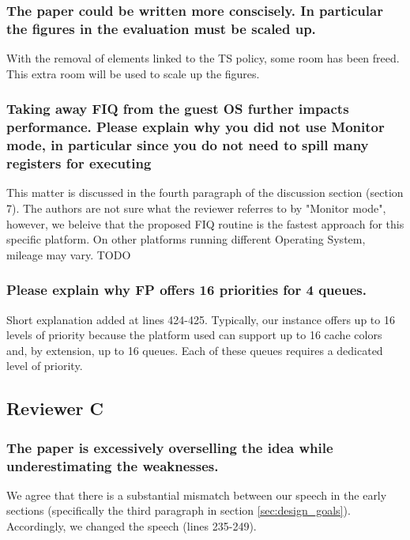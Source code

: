 

        \subsubsection{The paper could be written more conscisely. In particular the figures in the evaluation must be scaled up.}
            With the removal of elements linked to the TS policy, some room has been freed. This extra room will be used to scale up the figures.

        \subsubsection{Taking away FIQ from the guest OS further impacts performance. Please explain why you did not use Monitor mode, in particular since you do not need to spill many registers for executing}
            This matter is discussed in the fourth paragraph of the discussion section (section 7).
            The authors are not sure what the reviewer referres to by "Monitor mode", however, we beleive that the proposed FIQ routine is the fastest approach for this specific platform. On other platforms running different Operating System, mileage may vary.
            TODO

        \subsubsection{Please explain why FP offers 16 priorities for 4 queues.}
            Short explanation added at lines 424-425. Typically, our instance \schim offers up to 16 levels of priority because the platform used can support up to 16 cache colors and, by extension, up to 16 queues. Each of these queues requires a dedicated level of priority.

    \subsection{Reviewer C}
        \subsubsection{The paper is excessively overselling the idea while underestimating the weaknesses.}
            We agree that there is a substantial mismatch between our speech in the early sections (specifically the third paragraph in section \ref{sec:design_goals}).
            Accordingly, we changed the speech (lines 235-249).

